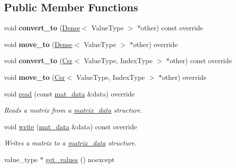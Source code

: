 \subsection*{Public Member Functions}
\begin{DoxyCompactItemize}
\item 
\mbox{\label{classgko_1_1matrix_1_1Sellp_ad7540eec38a5f267fc3078ff22ffb4d1}} 
void {\bfseries convert\+\_\+to} (\hyperlink{classgko_1_1matrix_1_1Dense}{Dense}$<$ Value\+Type $>$ $\ast$other) const override
\item 
\mbox{\label{classgko_1_1matrix_1_1Sellp_aba2fc06a17a24b8b0da36151e25357f3}} 
void {\bfseries move\+\_\+to} (\hyperlink{classgko_1_1matrix_1_1Dense}{Dense}$<$ Value\+Type $>$ $\ast$other) override
\item 
\mbox{\label{classgko_1_1matrix_1_1Sellp_a8c6a8a35f788ad8b5639b5bfaacfd732}} 
void {\bfseries convert\+\_\+to} (\hyperlink{classgko_1_1matrix_1_1Csr}{Csr}$<$ Value\+Type, Index\+Type $>$ $\ast$other) const override
\item 
\mbox{\label{classgko_1_1matrix_1_1Sellp_a86e1d5bd35f6308577159b5e324cb431}} 
void {\bfseries move\+\_\+to} (\hyperlink{classgko_1_1matrix_1_1Csr}{Csr}$<$ Value\+Type, Index\+Type $>$ $\ast$other) override
\item 
void \hyperlink{classgko_1_1matrix_1_1Sellp_a2c5ff4a3f190daf7d70bbd8451d13edd}{read} (const \hyperlink{structgko_1_1matrix__data}{mat\+\_\+data} \&data) override
\begin{DoxyCompactList}\small\item\em Reads a matrix from a \hyperlink{structgko_1_1matrix__data}{matrix\+\_\+data} structure. \end{DoxyCompactList}\item 
void \hyperlink{classgko_1_1matrix_1_1Sellp_aae2355a2866318b154d017b1c51f30a5}{write} (\hyperlink{structgko_1_1matrix__data}{mat\+\_\+data} \&data) const override
\begin{DoxyCompactList}\small\item\em Writes a matrix to a \hyperlink{structgko_1_1matrix__data}{matrix\+\_\+data} structure. \end{DoxyCompactList}\item 
value\+\_\+type $\ast$ \hyperlink{classgko_1_1matrix_1_1Sellp_ac9afd5f8000da345844ccb22b599acf7}{get\+\_\+values} () noexcept

\end{DoxyCompactItemize}
